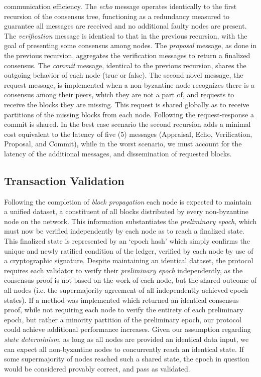 communication efficiency. The \textit{echo} message operates identically to the first recursion of the consensus tree, functioning as a redundancy measured to guarantee all messages are received and no additional faulty nodes are present. The \textit{verification} message is identical to that in the previous recursion, with the goal of presenting some consensus among nodes. The \textit{proposal} message, as  done in the previous recursion, aggregates the verification messages to return a finalized consensus. The \textit{commit} message, identical to the previous recursion, shares the outgoing behavior of each node (true or false). The second novel message, the request message, is implemented when a non-byzantine node recognizes there is a consensus among their peers, which they are not a part of, and requests to receive the blocks they are missing. This request is shared globally as to receive partitions of the missing blocks from each node. Following the request-response a commit is shared. In the best case scenario the second recursion adds a minimal cost equivalent to the latency of five (5) messages (Appraisal, Echo, Verification, Proposal, and Commit), while in the worst scenario, we must account for the latency of the additional messages, and dissemination of requested blocks.

\subsection{Transaction Validation}\label{struc:tx_valid}
Following the completion of \textit{block propagation} each node is expected to maintain a unified dataset, a constituent of all blocks distributed by every non-byzantine node on the network. This information substantiates the \textit{preliminary epoch}, which must now be verified independently by each node as to reach a finalized state. This finalized state is represented by an ‘epoch hash’ which simply confirms the unique and newly ratified condition of the ledger, verified by each node by use of a cryptographic signature. Despite maintaining an identical dataset, the protocol requires each validator to verify their \textit{preliminary epoch} independently, as the consensus proof is not based on the work of each node, but the shared outcome of all nodes (i.e. the supermajority agreement of all independently achieved epoch states). If a method was implemented which returned an identical consensus proof, while not requiring each node to verify the entirety of each preliminary epoch, but rather a minority partition of the preliminary epoch, our protocol could achieve additional performance increases. Given our assumption regarding \textit{state determinism}, as long as all nodes are provided an identical data input, we can expect all non-byzantine nodes to concurrently reach an identical state. If some  supermajority of nodes reached such a shared state, the epoch in question would be considered provably correct, and pass as validated.

